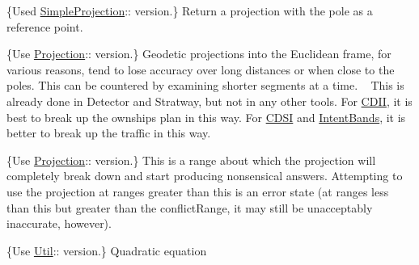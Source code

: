 \begin{DoxyRefList}
\item[Member \mbox{\hyperlink{namespacelarcfm_a03f4aef3fed6a0b927c45177c58334b6}{larcfm\+::polar\+\_\+xy}} (const \mbox{\hyperlink{classlarcfm_1_1_lat_lon_alt}{Lat\+Lon\+Alt}} \&lla, bool north)]\label{deprecated__deprecated000023}%
%
\{Used \mbox{\hyperlink{classlarcfm_1_1_simple_projection}{Simple\+Projection}}\+:\+: version.\} Return a projection with the pole as a reference point.  
\item[Member \mbox{\hyperlink{namespacelarcfm_a70df635c5278e20108288e57e89407cd}{larcfm\+::projection\+Conflict\+Range}} (double lat, double accuracy)]\label{deprecated__deprecated000018}%
%
\{Use \mbox{\hyperlink{classlarcfm_1_1_projection}{Projection}}\+:\+: version.\} Geodetic projections into the Euclidean frame, for various reasons, tend to lose accuracy over long distances or when close to the poles. This can be countered by examining shorter segments at a time. ~\newline
 This is already done in Detector and Stratway, but not in any other tools. For \mbox{\hyperlink{classlarcfm_1_1_c_d_i_i}{CDII}}, it is best to break up the ownship\textquotesingle{}s plan in this way. For \mbox{\hyperlink{classlarcfm_1_1_c_d_s_i}{CDSI}} and \mbox{\hyperlink{classlarcfm_1_1_intent_bands}{Intent\+Bands}}, it is better to break up the traffic in this way. 
\item[Member \mbox{\hyperlink{namespacelarcfm_a83aef93931f539ce1a2cd260eee220a2}{larcfm\+::projection\+Max\+Range}} ()]\label{deprecated__deprecated000019}%
%
\{Use \mbox{\hyperlink{classlarcfm_1_1_projection}{Projection}}\+:\+: version.\} This is a range about which the projection will completely break down and start producing nonsensical answers. Attempting to use the projection at ranges greater than this is an error state (at ranges less than this but greater than the conflict\+Range, it may still be unacceptably inaccurate, however). 
\item[Member \mbox{\hyperlink{namespacelarcfm_ad23da8916d55d1fe18d8208c37d96838}{larcfm\+::root}} (const double a, const double b, const double c, int eps)]\label{deprecated__deprecated000032}%
%
\{Use \mbox{\hyperlink{classlarcfm_1_1_util}{Util}}\+:\+: version.\} Quadratic equation  
\item[Member \mbox{\hyperlink{namespacelarcfm_abab1313984ee0ac0b9d93783700ff33e}{larcfm\+::root2b}} (const double a, const double b, const double c, const int eps)]\label{deprecated__deprecated000033}%

\end{DoxyRefList}
